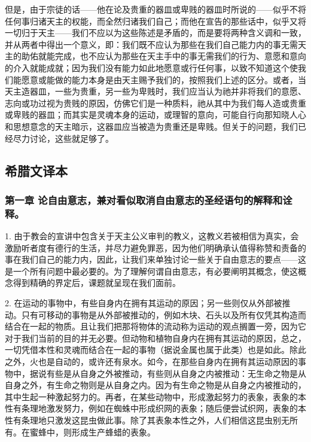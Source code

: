 但是，由于宗徒的话——他在论及贵重的器皿或卑贱的器皿时所说的——似乎不将任何事归诸天主的权能，而全然归诸我们自己；而他在宣告的那些话中，似乎又将一切归于天主——我们不应以为这些陈述是矛盾的，而是要将两种含义调和一致，并从两者中得出一个意义，即：我们既不应认为那些在我们自己能力内的事无需天主的助佑就能完成，也不应认为那些在天主手中的事无需我们的行为、意愿和意向的介入就能成就；因为我们没有能力如此地愿意或行任何事，以致不知道这个使我们能愿意或能做的能力本身是由天主赐予我们的，按照我们上述的区分。或者，当天主造器皿，一些为贵重，另一些为卑贱时，我们应当认为祂并非将我们的意愿、志向或功过视为贵贱的原因，仿佛它们是一种质料，祂从其中为我们每人造或贵重或卑贱的器皿；而其实是灵魂本身的运动，或理智的意向，可能自行向那知晓人心和思想意念的天主暗示，这器皿应当被造为贵重还是卑贱。但关于的问题，我们已经尽力讨论，这些就足够了。\par


\subsection{希腊文译本}


\subsubsection{第一章 论自由意志，兼对看似取消自由意志的圣经语句的解释和诠释。}

1. 由于教会的宣讲中包含关于天主公义审判的教义，这教义若被相信为真实，会激励听者度有德行的生活，并尽力避免罪恶，因为他们明确承认值得称赞和责备的事在我们自己的能力内，因此，让我们来单独讨论一些关于自由意志的要点——这是一个所有问题中最必要的。为了理解何谓自由意志，有必要阐明其概念，使这概念得到精确的界定后，课题就呈现在我们面前。\par

2. 在运动的事物中，有些自身内在拥有其运动的原因；另一些则仅从外部被推动。只有可移动的事物是从外部被推动的，例如木块、石头以及所有仅凭其构造而结合在一起的物质。且让我们把那将物体的流动称为运动的观点搁置一旁，因为它对于我们当前的目的并无必要。但动物和植物自身内在拥有其运动的原因，总之，一切凭借本性和灵魂而结合在一起的事物（据说金属也属于此类）也是如此。除此之外，火也是自动的，或许还有泉水。如今，在那些自身内在拥有其运动原因的事物中，据说有些是从自身之外被推动，有些则从自身之内被推动：无生命之物是从自身之外，有生命之物则是从自身之内。因为有生命之物是从自身之内被推动的，其中生起一种激起努力的。再者，在某些动物中，形成激起努力的表象，表象的本性有条理地激发努力，例如在蜘蛛中形成织网的表象；随后便尝试织网，表象的本性有条理地只激发这昆虫做此事。除了其表象本性之外，人们相信这昆虫别无所有。在蜜蜂中，则形成生产蜂蜡的表象。\par

